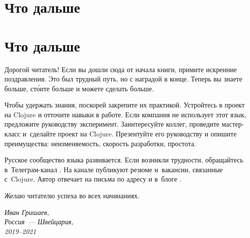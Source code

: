 
\ifx\MODE\PRINT
\chapter{Что дальше}
\else
\chapter*{Что дальше}
\fi

Дорогой читатель! Если вы дошли сюда от начала книги, примите искренние
поздравления. Это был трудный путь, но с наградой в конце. Теперь вы знаете
больше, ст\'{о}ите больше и можете сделать больше.

Чтобы удержать знания, поскорей закрепите их практикой. Устройтесь в проект на
Clojure и отточите навыки в работе. Если компания не использует этот язык,
предложите руководству эксперимент. Заинтересуйте коллег, проведите мастер-класс
и~сделайте проект на Clojure. Презентуйте его руководству и опишите
преимущества: неизменяемость, скорость разработки, простота.

Русское сообщество языка развивается. Если возникли трудности, обращайтесь
в~Телеграм-канал . На
канале  публикуют резюме
и~вакансии, связанные с~Clojure. Автор отвечает на письма по адресу
\EMAILLINK\xspace и в~блоге \SITELINK.

Желаю читателю успеха во всех начинаниях.

\vspace{1em}

\noindent

\hspace{\fill}\parbox{4cm}{\textit{Иван Гришаев,\\Россия~--- Швейцария,\\2019--2021}}
